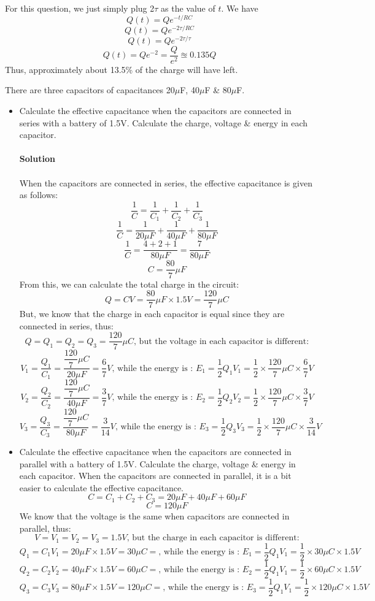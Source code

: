 \documentclass[9pt,addpoints]{exam}
\begin{document}
\begin{questions}
\begin{itemize}
			For this question, we just simply plug 2$\tau$ as the value of $t$. We have
			$$Q(t)=Qe^{-t/RC}$$
			$$Q(t)=Qe^{-2\tau/RC}$$
			$$Q(t)=Qe^{-2\tau/\tau}$$
			$$Q(t)=Qe^{-2}=\dfrac{Q}{e^2}\approxeq0.135Q$$
			Thus, approximately about 13.5\% of the charge will have left.
		\end{itemize}
		\question There are three capacitors of capacitances 20$\mu$F, 40$\mu$F \& 80$\mu$F.
		\begin{itemize}
			\item Calculate the effective capacitance when the capacitors are connected in series with a battery of 1.5V. Calculate the charge, voltage \& energy in each capacitor. \\ \\
			\textbf{Solution}\\ \\
			When the capacitors are connected in series, the effective capacitance is given as follows:
			$$\dfrac{1}{C}=\dfrac{1}{C_1}+\dfrac{1}{C_2}+\dfrac{1}{C_3}$$
			$$\dfrac{1}{C}=\dfrac{1}{20\mu F}+\dfrac{1}{40\mu F}+\dfrac{1}{80\mu F}$$
			$$\dfrac{1}{C}=\dfrac{4+2+1}{80\mu F}=\dfrac{7}{80\mu F}$$
			$$C=\dfrac{80}{7}\mu F$$
			From this, we can calculate the total charge in the circuit:
			$$Q=CV=\dfrac{80}{7}\mu F\times1.5V=\dfrac{120}{7}\mu C$$
			But, we know that the charge in each capacitor is equal since they are connected in series, thus: 
			$$Q=Q_1=Q_2=Q_3=\dfrac{120}{7}\mu C\text{, but the voltage in each capacitor is different:}$$
			$$V_1=\dfrac{Q_1}{C_1}=\dfrac{\dfrac{120}{7}\mu C}{20\mu F}=\dfrac{6}{7}V\text{, while the energy is :   }E_1=\dfrac{1}{2}Q_1V_1=\dfrac{1}{2}\times\dfrac{120}{7}\mu C\times\dfrac{6}{7}V$$
			$$V_2=\dfrac{Q_2}{C_2}=\dfrac{\dfrac{120}{7}\mu C}{40\mu F}=\dfrac{3}{7}V\text{, while the energy is :   }E_2=\dfrac{1}{2}Q_2V_2=\dfrac{1}{2}\times\dfrac{120}{7}\mu C\times\dfrac{3}{7}V$$
			$$V_3=\dfrac{Q_3}{C_3}=\dfrac{\dfrac{120}{7}\mu C}{80\mu F}=\dfrac{3}{14}V\text{, while the energy is :   }E_3=\dfrac{1}{2}Q_3V_3=\dfrac{1}{2}\times\dfrac{120}{7}\mu C\times\dfrac{3}{14}V$$
			\item Calculate the effective capacitance when the capacitors are connected in parallel with a battery of 1.5V. Calculate the charge, voltage \& energy in each capacitor.
			When the capacitors are connected in parallel, it is a bit easier to calculate the effective capacitance.
			$$C=C_1+C_2+C_3=20\mu F+40\mu F+60\mu F$$
			$$C=120\mu F$$
			We know that the voltage is the same when capacitors are connected in parallel, thus:
  			$$V=V_1=V_2=V_3=1.5V\text{, but the charge in each capacitor is different:}$$
			$$Q_1=C_1V_1=20\mu F\times1.5V=30\mu C=\text{, while the energy is :   }E_1=\dfrac{1}{2}Q_1V_1=\dfrac{1}{2}\times30\mu C\times1.5V$$
			$$Q_2=C_2V_2=40\mu F\times1.5V=60\mu C=\text{, while the energy is :   }E_2=\dfrac{1}{2}Q_1V_1=\dfrac{1}{2}\times60\mu C\times1.5V$$
			$$Q_3=C_3V_3=80\mu F\times1.5V=120\mu C=\text{, while the energy is :   }E_3=\dfrac{1}{2}Q_1V_1=\dfrac{1}{2}\times120\mu C\times1.5V$$
		\end{itemize}

\end{questions}
\end{document}
